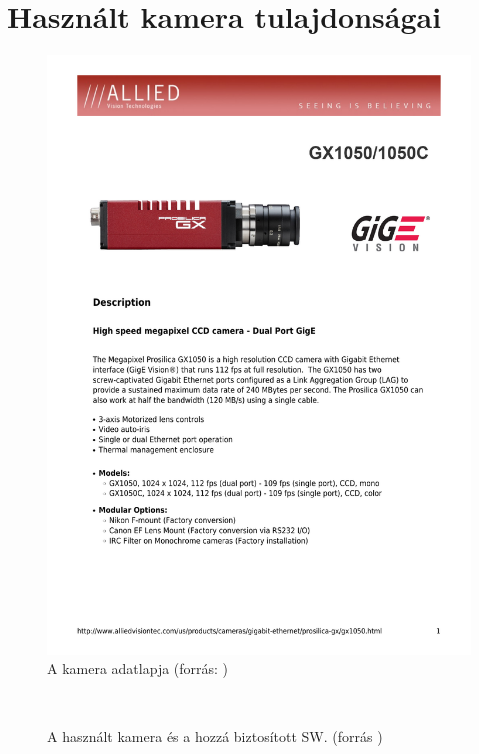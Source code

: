 \section{Használt kamera tulajdonságai}
\begin{figure}[!h]
\begin{center}
  \includegraphics[width=0.75\columnwidth,page=2]{Prosilica_GX_DataSheet_1050_en.pdf}
  \caption[A kamera adatlapja]{A kamera adatlapja (forrás: \cite{gx1050})}
  \label{fig:cam_doc}
\end{center}
\end{figure}

\begin{figure}[htp]
\centering
	\\
	\caption[A használt kamera és a hozzá biztosított SW.]{A használt kamera és a hozzá biztosított SW.
	(forrás \cite{gx1050})}
	\label{fig:cam}
\end{figure}

